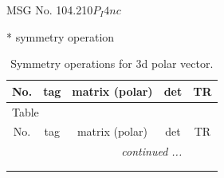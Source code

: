 \documentclass[fleqn,8pt]{jsarticle}
\begin{document}
\setcounter{MaxMatrixCols}{32}

\renewcommand{\tablename}{Table~}
\renewcommand{\figurename}{Figure~}
\begin{center}
\LARGE
MSG No. 104.210\quad$P_{I}4nc$
\end{center}
* symmetry operation
\renewcommand{\arraystretch}{1.3}
\begin{longtable}{ccccc}
\caption{Symmetry operations for 3d polar vector.}
 \\
 \hline \hline
No. & tag & matrix (polar) & det & TR \\ \hline \endfirsthead

\multicolumn{4}{l}{\tablename\ \thetable{}} \\
 \hline \hline
No. & tag & matrix (polar) & det & TR \\ \hline \endhead

 \hline \hline
\multicolumn{4}{r}{\footnotesize\it continued ...} \\ \endfoot

 \hline \hline
\multicolumn{4}{r}{} \\ \endlastfoot


\end{longtable}
\end{document}
